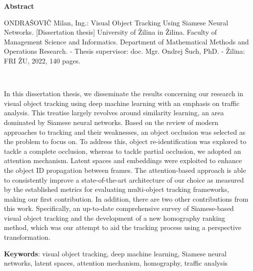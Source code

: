 \thispagestyle{empty}

\begin{center}
    \Large{\textbf{Abstract}}
\end{center}

\noindent ONDRAŠOVIČ Milan, Ing.: Visual Object Tracking Using Siamese Neural Networks.
    [Dissertation thesis] University of Žilina in Žilina. Faculty of Management Science and Informatics. Department of Mathematical Methods and Operations Research. - Thesis supervisor: doc. Mgr. Ondrej Šuch, PhD. - Žilina: FRI ŽU, 2022, 140 pages.

\

\noindent In this dissertation thesis, we disseminate the results concerning our research in visual object tracking using deep machine learning with an emphasis on traffic analysis. This treatise largely revolves around similarity learning, an area dominated by Siamese neural networks. Based on the review of modern approaches to tracking and their weaknesses, an object occlusion was selected as the problem to focus on. To address this, object re-identification was explored to tackle a complete occlusion, whereas to tackle partial occlusion, we adopted an attention mechanism. Latent spaces and embeddings were exploited to enhance the object ID propagation between frames. The attention-based approach is able to consistently improve a state-of-the-art architecture of our choice as measured by the established metrics for evaluating multi-object tracking frameworks, making our first contribution. In addition, there are two other contributions from this work. Specifically, an up-to-date comprehensive survey of Siamese-based visual object tracking and the development of a new homography ranking method, which was our attempt to aid the tracking process using a perspective transformation.

\noindent \textbf{Keywords}: visual object tracking, deep machine learning, Siamese neural networks, latent spaces, attention mechanism, homography, traffic analysis
